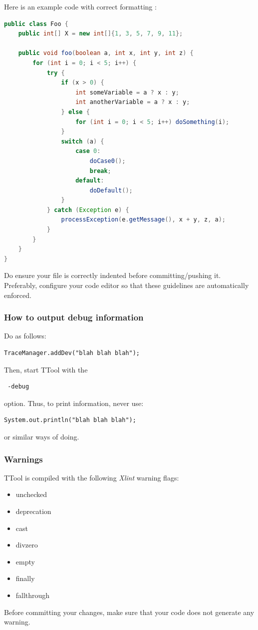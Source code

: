 \documentclass[12pt]{article}
\begin{document}
Here is an example code with correct formatting : \\

\begin{lstlisting}[showspaces=true, language=java, commentstyle=\color{pgreen},
keywordstyle=\color{pblue}, stringstyle=\color{pred}, basicstyle=\ttfamily]
public class Foo {
    public int[] X = new int[]{1, 3, 5, 7, 9, 11};

    public void foo(boolean a, int x, int y, int z) {
        for (int i = 0; i < 5; i++) {
            try {
                if (x > 0) {
                    int someVariable = a ? x : y;
                    int anotherVariable = a ? x : y;
                } else {
                    for (int i = 0; i < 5; i++) doSomething(i);
                }
                switch (a) {
                    case 0:
                        doCase0();
                        break;
                    default:
                        doDefault();
                }
            } catch (Exception e) {
                processException(e.getMessage(), x + y, z, a);
            }
        }
    }
}
\end{lstlisting}

Do ensure your file is correctly indented before committing/pushing it.
Preferably, configure your code editor so that these guidelines are
automatically enforced.


\subsubsection{How to output debug information}
\label{sec:debug_info}
Do as follows:
\begin{lstlisting}
TraceManager.addDev("blah blah blah");
\end{lstlisting}
Then, start TTool with the 
\begin{verbatim}
 -debug
\end{verbatim}
option.
Thus, to print information, never use:
\begin{lstlisting}
System.out.println("blah blah blah");
\end{lstlisting}
or similar ways of doing.

\subsubsection{Warnings}
TTool is compiled with the following \textit{Xlint} warning flags:
\begin{itemize}
    \item unchecked
    \item deprecation
    \item cast
    \item divzero
    \item empty
    \item finally
    \item fallthrough
\end{itemize}
Before committing your changes, make sure that your code does not generate any
warning.
\end{document}
